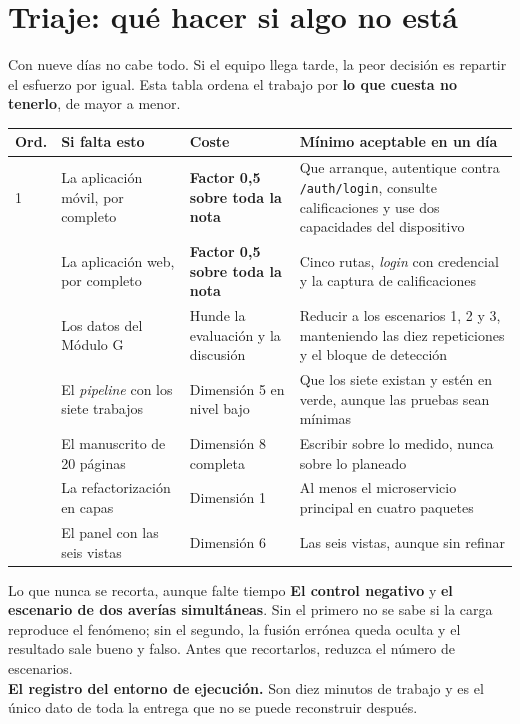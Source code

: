 \documentclass[11pt,a4paper]{article}
\begin{document}
\section{Triaje: qué hacer si algo no está}

Con nueve días no cabe todo. Si el equipo llega tarde, la peor decisión es repartir el esfuerzo por igual. Esta tabla ordena el trabajo por \textbf{lo que cuesta no tenerlo}, de mayor a menor.

\begin{center}
	\small
	\begin{longtable}{@{}p{0.9cm}p{5.4cm}p{3.0cm}p{5.0cm}@{}}
		\toprule
		\textbf{Ord.} & \textbf{Si falta esto} & \textbf{Coste} & \textbf{Mínimo aceptable en un día} \\
		\midrule
		\endhead
		1 & La aplicación móvil, por completo & \textbf{Factor 0,5 sobre toda la nota} & Que arranque, autentique contra \texttt{/auth/login}, consulte calificaciones y use dos capacidades del dispositivo \\
		\addlinespace
		2 & La aplicación web, por completo & \textbf{Factor 0,5 sobre toda la nota} & Cinco rutas, \emph{login} con credencial y la captura de calificaciones \\
		\addlinespace
		3 & Los datos del Módulo G & Hunde la evaluación y la discusión & Reducir a los escenarios 1, 2 y 3, manteniendo las diez repeticiones y el bloque de detección \\
		\addlinespace
		4 & El \emph{pipeline} con los siete trabajos & Dimensión 5 en nivel bajo & Que los siete existan y estén en verde, aunque las pruebas sean mínimas \\
		\addlinespace
		5 & El manuscrito de 20 páginas & Dimensión 8 completa & Escribir sobre lo medido, nunca sobre lo planeado \\
		\addlinespace
		6 & La refactorización en capas & Dimensión 1 & Al menos el microservicio principal en cuatro paquetes \\
		\addlinespace
		7 & El panel con las seis vistas & Dimensión 6 & Las seis vistas, aunque sin refinar \\
		\bottomrule
	\end{longtable}
\end{center}

\begin{pisoBox}{Lo que nunca se recorta, aunque falte tiempo}
	\textbf{El control negativo} y \textbf{el escenario de dos averías simultáneas}. Sin el primero no se sabe si la carga reproduce el fenómeno; sin el segundo, la fusión errónea queda oculta y el resultado sale bueno y falso. Antes que recortarlos, reduzca el número de escenarios.\\[5pt]
	\textbf{El registro del entorno de ejecución.} Son diez minutos de trabajo y es el único dato de toda la entrega que no se puede reconstruir después.
\end{pisoBox}
\end{document}
